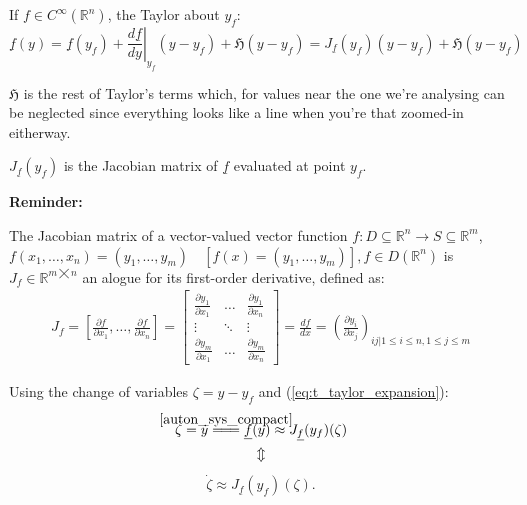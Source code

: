 If $f \in C^\infty(\mathbb{R}^n) $, the Taylor about $y_f$:
\begin{equation}\label{eq:t_taylor_expansion}
\underline{f}(y) = \underline{f}(y_f) + \left. \frac{d \underline{f}}{dy} \right|_{y_f}(y - y_f) + \mathfrak{H}(y - y_f) = J_{\underline{f}}(y_f)(y - y_f) + \mathfrak{H}(y - y_f) \tag{Taylor}
\end{equation}

$\mathfrak{H}$ is the rest of Taylor's terms which, for values near the one we're analysing can be neglected since everything looks like a line when you're that zoomed-in eitherway.

$J_{\underline{f}}(y_f)$ is the Jacobian matrix of $\underline{f}$ evaluated at point $y_f$.

\textbf{Reminder:}
\begin{definition}
The Jacobian matrix of a vector-valued vector function $f : D \subseteq \mathbb{R}^n \rightarrow S \subseteq \mathbb{R}^m$, $f(x_1, \dots, x_n) = (y_1, \dots , y_m) \quad [f(x) = (y_1, \dots , y_m)], f \in D(\mathbb{R}^n)$ is $J_f \in \mathbb{R}^{m \bigtimes n}$ an alogue for its first-order derivative, defined as:
\begin{align*}
	J_f = \left[ \frac{\partial f}{\partial x_1}, \dots , \frac{\partial f}{\partial x_n}  \right] =
	\begin{bmatrix*}
		\frac{\partial y_1}{\partial x_1} & \dots & \frac{\partial y_1}{\partial x_n} \\
		\vdots & \ddots & \vdots \\
		\frac{\partial y_m}{\partial x_1} & \dots &  \frac{\partial y_m}{\partial x_n}
	\end{bmatrix*} =
	\frac{df}{dx} =
	\left(   \frac{\partial y_i}{\partial x_j} \right)_{ij | 1 \leqslant i \leqslant n, 1 \leqslant j \leqslant m}
\end{align*}
\end{definition}

\newcommand\eqCuzOfSys{\stackrel{\mathclap{\normalfont\mbox{\ref{auton_sys_compact}}}}{=\joinrel=\joinrel=}}

Using the change of variables $\zeta = y - y_f$ and (\ref{eq:t_taylor_expansion}):
\begin{gather*}
\dot{\zeta} = \dot{y} \eqCuzOfSys \underline{f}(y) \approx J_{\underline{f}}(y_f)(\zeta) \\
\Updownarrow
\end{gather*}
\vspace*{-16mm}
\begin{gather}\label{eq:lin_approx}
\dot{\zeta} \approx J_{\underline{f}}(y_f)(\zeta). \tag{Lin. Approx.}
\end{gather}

